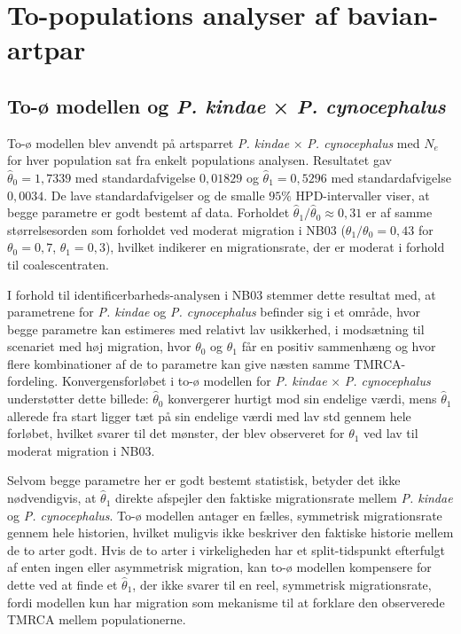 \documentclass[
  10pt,
  a4paper,
]{scrbook}
\let\oldemph\emph
\renewcommand\emph[1]{\oldemph{\color{gray}#1}}
\begin{document}
\section{To-populations analyser af
bavian-artpar}\label{to-populations-analyser-af-bavian-artpar}

\subsection{\texorpdfstring{To-ø modellen og \emph{P. kindae} × \emph{P.
cynocephalus}}{To-ø modellen og P. kindae × P. cynocephalus}}\label{to-uxf8-modellen-og-p.-kindae-p.-cynocephalus}

To-ø modellen blev anvendt på artsparret \emph{P. kindae} × \emph{P.
cynocephalus} med \(N_e\) for hver population sat fra enkelt populations
analysen. Resultatet gav \(\hat\theta_0 = 1{,}7339\) med
standardafvigelse \(0{,}01829\) og \(\hat\theta_1 = 0{,}5296\) med
standardafvigelse \(0{,}0034\). De lave standardafvigelser og de smalle
\(95\%\) HPD-intervaller viser, at begge parametre er godt bestemt af
data. Forholdet \(\hat\theta_1/\hat\theta_0 \approx 0{,}31\) er af samme
størrelsesorden som forholdet ved moderat migration i NB03
(\(\theta_1/\theta_0=0{,}43\) for \(\theta_0=0{,}7\),
\(\theta_1=0{,}3\)), hvilket indikerer en migrationsrate, der er moderat
i forhold til coalescentraten.

I forhold til identificerbarheds-analysen i NB03 stemmer dette resultat
med, at parametrene for \emph{P. kindae} og \emph{P. cynocephalus}
befinder sig i et område, hvor begge parametre kan estimeres med
relativt lav usikkerhed, i modsætning til scenariet med høj migration,
hvor \(\theta_0\) og \(\theta_1\) får en positiv sammenhæng og hvor
flere kombinationer af de to parametre kan give næsten samme
TMRCA-fordeling. Konvergensforløbet i to-ø modellen for \emph{P. kindae}
× \emph{P. cynocephalus} understøtter dette billede: \(\hat\theta_0\)
konvergerer hurtigt mod sin endelige værdi, mens \(\hat\theta_1\)
allerede fra start ligger tæt på sin endelige værdi med lav std gennem
hele forløbet, hvilket svarer til det mønster, der blev observeret for
\(\theta_1\) ved lav til moderat migration i NB03.

Selvom begge parametre her er godt bestemt statistisk, betyder det ikke
nødvendigvis, at \(\hat\theta_1\) direkte afspejler den faktiske
migrationsrate mellem \emph{P. kindae} og \emph{P. cynocephalus}. To-ø
modellen antager en fælles, symmetrisk migrationsrate gennem hele
historien, hvilket muligvis ikke beskriver den faktiske historie mellem
de to arter godt. Hvis de to arter i virkeligheden har et
split-tidspunkt efterfulgt af enten ingen eller asymmetrisk migration,
kan to-ø modellen kompensere for dette ved at finde et \(\hat\theta_1\),
der ikke svarer til en reel, symmetrisk migrationsrate, fordi modellen
kun har migration som mekanisme til at forklare den observerede TMRCA
mellem populationerne.
\end{document}
